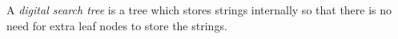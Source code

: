 \documentclass[12pt]{article}
\begin{document}
A \emph{digital search tree} is a tree which stores strings internally so that there is no need for extra leaf nodes to store the strings.
\end{document}
